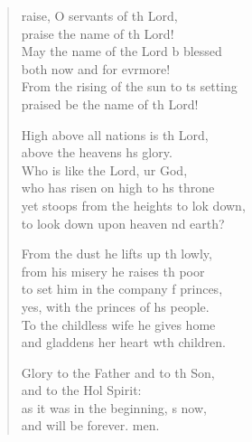 \settowidth{\versewidth}{From the rising of the sun to its setting *}
\begin{verse}%
  \begin{patverse}
raise, O servants of th Lord,\Med\\
praise the name of th Lord!\\
May the name of the Lord b blessed\Med\\
both now and for evrmore!\\
From the rising of the sun to \pointup{\i}ts setting\Med\\
praised be the name of th Lord!

High above all nations is th Lord,\Med\\
above the heavens h\pointup{\i}s glory.\\
Who is like the Lord, ur God,\Med\\
who has risen on high to h\pointup{\i}s throne\\
yet stoops from the heights to lok down,\Med\\
to look down upon heaven nd earth?

From the dust he lifts up th lowly,\Med\\
from his misery he raises th poor\\
to set him in the company f princes,\Med\\
yes, with the princes of h\pointup{\i}s people.\\
To the childless wife he gives  home\Med\\
and gladdens her heart w\pointup{\i}th children.

Glory to the Father and to th Son,\Med\\
and to the Hol Spirit:\\
as it was in the beginning, \pointup{\i}s now,\Med\\
and will be forever. men.
  \end{patverse}
\end{verse}
